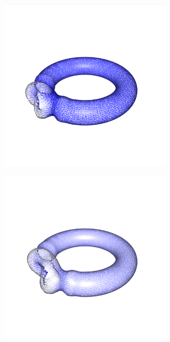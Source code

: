 \documentclass[crop=false]{standalone}
\begin{document}
\begin{figure}[h]
\begin{subfigure}[b]{0.24\textwidth}
        \caption{}
      \end{subfigure}
      \begin{subfigure}[b]{0.24\textwidth}
        \center
        \includegraphics[trim={0.2cm 3.9cm 3.15cm 5.8cm},clip,width=0.95\textwidth]{images/torus_wave_2.png}
        \caption{}
      \end{subfigure}
      \begin{subfigure}[b]{0.24\textwidth}
        \center
        \includegraphics[trim={0.2cm 3.9cm 3.15cm 5.8cm},clip,width=0.95\textwidth]{images/torus_wave_3.png}
        \caption{}
      \end{subfigure}


\end{figure}
\end{document}
